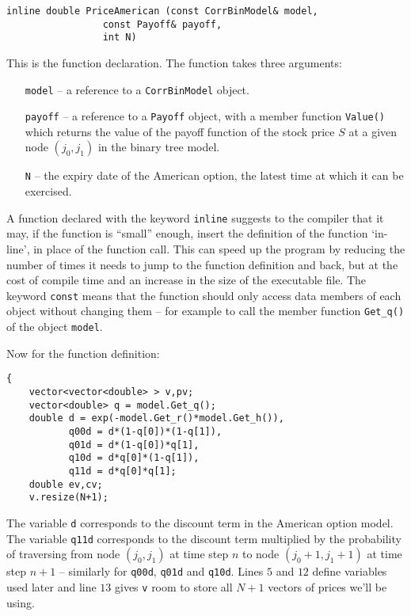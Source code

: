 \documentclass[12pt,a4paper]{article}
\begin{document}
\begin{lstlisting}
inline double PriceAmerican (const CorrBinModel& model, 
			     const Payoff& payoff, 
			     int N)
\end{lstlisting}
This is the function declaration. 
The function takes three arguments:
\begin{itemize}
	\item[\texttt{model}] -- a reference to a \texttt{CorrBinModel} object.
	\item[\texttt{payoff}] -- a reference to a \texttt{Payoff} object, with a 
member function \texttt{Value()} which returns the value of the payoff function 
of the stock price $S$ at a given node $(j_0,j_1)$ in the binary tree model.
	\item[\texttt{N}] -- the expiry date of the American option, the latest time at 
which it can be exercised.
\end{itemize}
A function declared with the keyword \texttt{inline} suggests to the compiler that it may, if the function is ``small'' enough, insert the definition of the function `in-line', in place of the function call. This can speed up the program by reducing the number of times it needs to jump to the function definition and back, but at the cost of compile time and an increase in the size of the executable file. The keyword \texttt{const} means that the function should only access data members of each object without changing them -- for example to call the member function \texttt{Get\_q()} of the object \texttt{model}.



Now for the function definition:
\begin{lstlisting}
{
    vector<vector<double> > v,pv;
    vector<double> q = model.Get_q();
    double d = exp(-model.Get_r()*model.Get_h()),
           q00d = d*(1-q[0])*(1-q[1]),
           q01d = d*(1-q[0])*q[1],
           q10d = d*q[0]*(1-q[1]),
           q11d = d*q[0]*q[1];
    double ev,cv;
    v.resize(N+1);
\end{lstlisting}

The variable \texttt{d} corresponds to the discount term in the American option 
model.
The variable \texttt{q11d} corresponds to the discount term multiplied by the 
probability of traversing from node $(j_0,j_1)$ at time step $n$ to node 
$(j_0+1,j_1+1)$ at time step $n+1$ -- similarly for \texttt{q00d}, \texttt{q01d} 
and \texttt{q10d}.
Lines $5$ and $12$ define variables used later and line $13$ gives \texttt{v} 
room to store all $N+1$ vectors of prices we'll be using.
\end{document}
